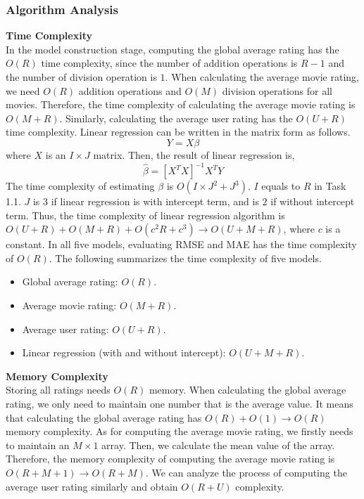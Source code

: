 \documentclass[12pt]{article}
\begin{document}
\subsubsection{Algorithm Analysis}
\noindent\textbf{Time Complexity}\\
In the model construction stage, computing the global average rating has the $O(R)$ time complexity, since the number of addition operations is $R - 1$ and the number of division operation is $1$. When calculating the average movie rating, we need  $O(R)$ addition operations and $O(M)$ division operations for all movies. Therefore, the time complexity of calculating the average movie rating is $O(M + R)$. Similarly, calculating the average user rating has the $O(U + R)$ time complexity. Linear regression can be written in the matrix form as follows.
$$
Y = X\beta
$$
where $X$ is an $I\times J$ matrix. Then, the result of linear regression is,
$$
\hat{\beta} = \left[ X^TX \right]^{-1} X^TY
$$
The time complexity of estimating $\beta$ is $O(I\times J^2 + J^3)$. $I$ equals to $R$ in Task 1.1. $J$ is $3$ if linear regression is with intercept term, and is $2$ if without intercept term. Thus, the time complexity of linear regression algorithm is $O(U + R) + O(M + R) + O(c^2R + c^3)\rightarrow O(U + M + R)$, where $c$ is a constant. In all five models, evaluating RMSE and MAE has the time complexity of $O(R)$. The following summarizes the time complexity of five models.
\begin{itemize}
    \item Global average rating: $O(R)$.
    \item Average movie rating: $O(M + R)$.
    \item Average user rating: $O(U + R)$.
    \item Linear regression (with and without intercept): $O(U + M + R)$.
\end{itemize}
\par
\vspace{0.3cm}
\noindent\textbf{Memory Complexity}\\
Storing all ratings needs $O(R)$ memory. When calculating the global average rating, we only need to maintain one number that is the average value. It means that calculating the global average rating has $O(R) + O(1)\rightarrow O(R)$ memory complexity. As for computing the average movie rating, we firstly needs to maintain an $M\times 1$ array. Then, we calculate the mean value of the array. Therefore, the memory complexity of computing the average movie rating is $O(R + M + 1) \rightarrow O(R + M)$. We can analyze the process of computing the average user rating similarly and obtain $O(R + U)$ complexity.
\end{document}
